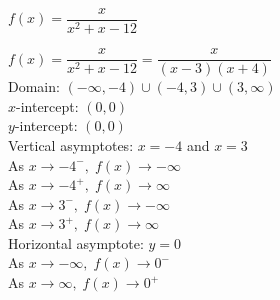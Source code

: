{$f(x) = \dfrac{x}{x^{2} + x - 12}$}
{$f(x) = \dfrac{x}{x^{2} + x - 12} = \dfrac{x}{(x - 3)(x + 4)}$\\
Domain: $(-\infty, -4) \cup (-4, 3) \cup (3, \infty)$\\
$x$-intercept: $(0, 0)$\\
$y$-intercept: $(0, 0)$\\
Vertical asymptotes: $x = -4$ and $x = 3$\\
As $x \rightarrow -4^{-}, \; f(x) \rightarrow -\infty$\\
As $x \rightarrow -4^{+}, \; f(x) \rightarrow \infty$\\
As $x \rightarrow 3^{-}, \; f(x) \rightarrow -\infty$\\
As $x \rightarrow 3^{+}, \; f(x) \rightarrow \infty$\\
Horizontal asymptote: $y = 0$\\
As $x \rightarrow -\infty, \; f(x) \rightarrow 0^{-}$\\
As $x \rightarrow \infty, \; f(x) \rightarrow 0^{+}$



\begin{center}
\end{center}}